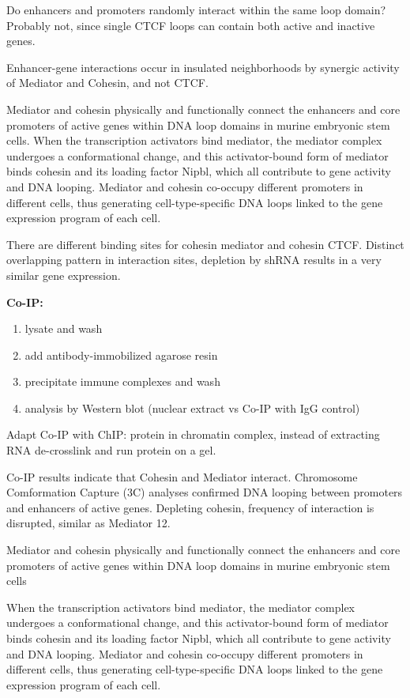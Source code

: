 Do enhancers and promoters randomly interact within the same loop domain? Probably not, since single CTCF loops can contain both active and inactive genes.

Enhancer-gene interactions occur in insulated neighborhoods by synergic activity of Mediator and Cohesin, and not CTCF.

Mediator and cohesin physically and functionally connect the enhancers and core promoters of active genes within DNA loop domains in murine embryonic stem cells. When the transcription activators bind mediator, the mediator complex undergoes a conformational change, and this activator-bound form of mediator binds cohesin and its loading factor Nipbl, which all contribute to gene activity and DNA looping. Mediator and cohesin co-occupy different promoters in different cells, thus generating cell-type-specific DNA loops linked to the gene expression program of each cell.

There are different binding sites for cohesin mediator and cohesin CTCF. Distinct overlapping pattern in interaction sites, depletion by shRNA results in a very similar gene expression.

\textbf{Co-IP:}

\begin{enumerate}
\def\labelenumi{\arabic{enumi}.}
\tightlist
\item
  lysate and wash
\item
  add antibody-immobilized agarose resin
\item
  precipitate immune complexes and wash
\item
  analysis by Western blot (nuclear extract vs Co-IP with IgG control)
\end{enumerate}

Adapt Co-IP with ChIP: protein in chromatin complex, instead of extracting RNA de-crosslink and run protein on a gel.

Co-IP results indicate that Cohesin and Mediator interact. Chromosome Comformation Capture (3C) analyses confirmed DNA looping between promoters and enhancers of active genes. Depleting cohesin, frequency of interaction is disrupted, similar as Mediator 12.

Mediator and cohesin physically and functionally connect the enhancers and core
promoters of active genes within DNA loop domains in murine embryonic stem cells

When the transcription activators bind mediator, the mediator complex undergoes a conformational change, and this activator-bound form of mediator binds cohesin and its loading factor Nipbl, which all contribute to gene activity and DNA looping. Mediator and cohesin co-occupy different promoters in different cells, thus generating cell-type-specific DNA loops linked to the gene expression program of each cell.

